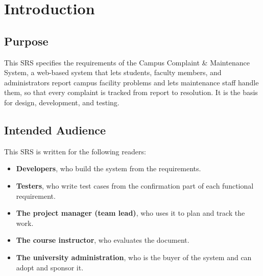 \chapter{Introduction}
\label{ch:intro}

\section{Purpose}
This SRS specifies the requirements of the Campus Complaint \& Maintenance System, a web-based system that lets students, faculty members, and administrators report campus facility problems and lets maintenance staff handle them, so that every complaint is tracked from report to resolution. It is the basis for design, development, and testing.

\section{Intended Audience}
This SRS is written for the following readers:

\begin{itemize}
  \item \textbf{Developers}, who build the system from the requirements.
  \item \textbf{Testers}, who write test cases from the confirmation part of each functional requirement.
  \item \textbf{The project manager (team lead)}, who uses it to plan and track the work.
  \item \textbf{The course instructor}, who evaluates the document.
  \item \textbf{The university administration}, who is the buyer of the system and can adopt and sponsor it.
\end{itemize}

